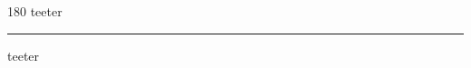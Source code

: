 
\begin{frame}
\begin{center}
\begin{turn}{180}
{\fontsize{2.5cm}{1em}\selectfont teeter}
\end{turn}
\vspace{1em}\par  
\hrule
\vspace{1em}\par  
{\fontsize{2.5cm}{1em}\selectfont teeter}
\end{center}
\end{frame}
